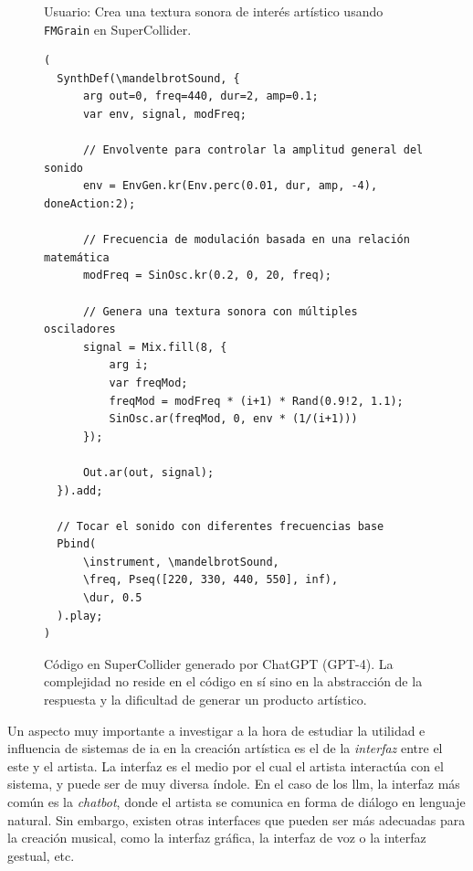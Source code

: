 \begin{figure}%
  \caption[holita]{Código en SuperCollider generado por ChatGPT (GPT-4). La complejidad no reside en el código en sí sino en la abstracción de la respuesta y la dificultad de generar un producto artístico.}
  \vspace{-.5cm}
  \centering
    \begin{mdframed}
      \fontsize{9.5pt}{11pt}\selectfont
      Usuario: Crea una textura sonora de interés artístico usando \texttt{FMGrain} en SuperCollider.
    \end{mdframed}
    \centering
      \begin{lstlisting}[style=SuperCollider-IDE, basicstyle=\footnotesize\ttfamily, numbers=none]
(
  SynthDef(\mandelbrotSound, {
      arg out=0, freq=440, dur=2, amp=0.1;
      var env, signal, modFreq;
  
      // Envolvente para controlar la amplitud general del sonido
      env = EnvGen.kr(Env.perc(0.01, dur, amp, -4), doneAction:2);
  
      // Frecuencia de modulación basada en una relación matemática
      modFreq = SinOsc.kr(0.2, 0, 20, freq);
  
      // Genera una textura sonora con múltiples osciladores
      signal = Mix.fill(8, {
          arg i;
          var freqMod;
          freqMod = modFreq * (i+1) * Rand(0.9!2, 1.1);
          SinOsc.ar(freqMod, 0, env * (1/(i+1)))
      });
  
      Out.ar(out, signal);
  }).add;
  
  // Tocar el sonido con diferentes frecuencias base
  Pbind(
      \instrument, \mandelbrotSound,
      \freq, Pseq([220, 330, 440, 550], inf),
      \dur, 0.5
  ).play;
)       
      \end{lstlisting}
  
  \source{\propio}
  \label{fig:supercollider_mandelbrot}
\end{figure}


Un aspecto muy importante a investigar a la hora de estudiar la utilidad e influencia de sistemas de \gls{ia} en la creación artística es el de la \emph{interfaz} entre el este y el artista. La interfaz es el medio por el cual el artista interactúa con el sistema, y puede ser de muy diversa índole. En el caso de los \gls{llm}, la interfaz más común es la \emph{chatbot}, donde el artista se comunica en forma de diálogo en lenguaje natural. Sin embargo, existen otras interfaces que pueden ser más adecuadas para la creación musical, como la interfaz gráfica, la interfaz de voz o la interfaz gestual, etc.

